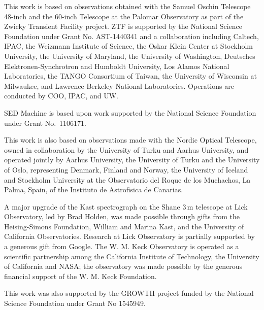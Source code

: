 \documentclass[twocolumn]{aastex631}
\begin{document}
This work is based on observations obtained with the Samuel Oschin Telescope 48-inch and the 60-inch Telescope at the Palomar Observatory as part of the Zwicky Transient Facility project. ZTF is supported by the National Science Foundation under Grant No. AST-1440341 and a collaboration including Caltech, IPAC, the Weizmann Institute of Science, the Oskar Klein Center at Stockholm University, the University of Maryland, the University of Washington, Deutsches Elektronen-Synchrotron and Humboldt University, Los Alamos National Laboratories, the TANGO Consortium of Taiwan, the University of Wisconsin at Milwaukee, and Lawrence Berkeley National Laboratories. Operations are conducted by COO, IPAC, and UW.

SED Machine is based upon work supported by the National Science Foundation under Grant No.\ 1106171.

This work is also based on observations made with the Nordic Optical Telescope, owned in collaboration by the University of Turku and Aarhus University, and operated jointly by Aarhus University, the University of Turku and the University of Oslo, representing Denmark, Finland and Norway, the University of Iceland and Stockholm University at the Observatorio del Roque de los Muchachos, La Palma, Spain, of the Instituto de Astrofisica de Canarias.

A major upgrade of the Kast spectrograph on the Shane 3\,m telescope at Lick Observatory, led by Brad Holden, was made possible through gifts from the Heising-Simons Foundation, William and Marina Kast, and the University of California Observatories. Research at Lick Observatory is partially supported by a generous gift from Google. The W. M. Keck Observatory is operated as a scientific partnership among the California Institute of Technology, the University of California and NASA; the observatory was made possible by the generous financial support of the W. M. Keck Foundation.

This work was also supported by the GROWTH project \citep{Kasliwal2019} funded by the National Science Foundation under Grant No 1545949.

\end{document}
